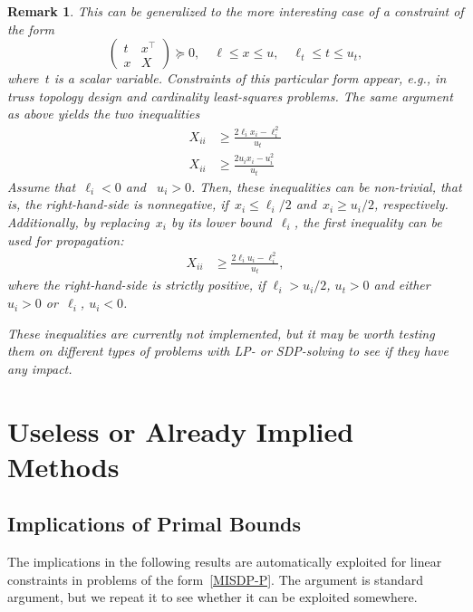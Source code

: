 \documentclass[10pt, a4paper]{article}
\newcommand{\T}{^{\top}}
\newtheorem{remark}[theorem]{Remark}
\begin{document}
\begin{remark}
  This can be generalized to the more interesting case of a
  constraint of the form
  \[
  \begin{pmatrix}
    t & x\T \\
    x & X
  \end{pmatrix}
  \succeq 0,
  \quad
  \ell \leq x \leq u,\quad \ell_t \leq t \leq u_t,
\]
where~$t$ is a scalar variable. Constraints of this particular form
appear, e.g., in truss topology design and cardinality least-squares
problems. The same argument as above yields the two inequalities
\begin{align*}
  X_{ii} &\geq \frac{2 \ell_i x_i - \ell_i^2}{u_t} \\
  X_{ii} &\geq \frac{2 u_i x_i - u_i^2}{u_t}
\end{align*}
Assume that~$\ell_i < 0$ and ~$u_i > 0$. Then, these inequalities can be
non-trivial, that is, the right-hand-side is nonnegative,
if~$x_i \leq \ell_i/2$ and~$x_i \geq u_i/2$, respectively. Additionally, by
replacing~$x_i$ by its lower bound~$\ell_i$, the first inequality can be
used for propagation:
\begin{align*}
  X_{ii} &\geq \frac{2 \ell_i u_i - \ell_i^2}{u_t},
\end{align*}
where the right-hand-side is strictly positive, if $\ell_i > u_i/2$, $u_t >
0$ and either~$u_i > 0$ or~$\ell_i$, $u_i < 0$.

These inequalities are currently not implemented, but it may be worth
testing them on different types of problems with LP- or SDP-solving to see
if they have any impact.
\end{remark}


\section{Useless or Already Implied Methods}


\subsection{Implications of Primal Bounds}

The implications in the following results are automatically exploited for
linear constraints in problems of the form~\eqref{MISDP-P}. The argument
is standard argument, but we repeat it to see whether it can be exploited
somewhere.
\end{document}
